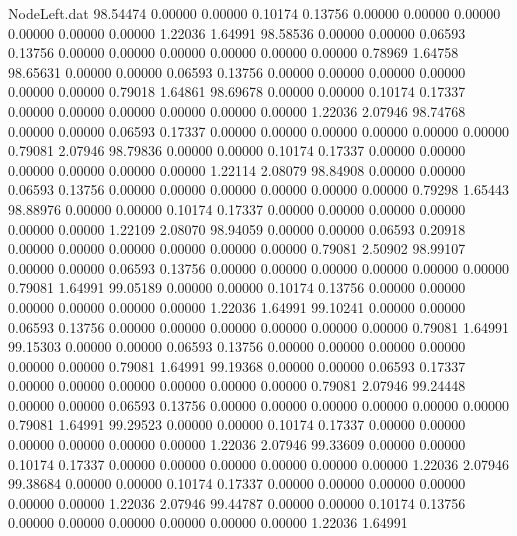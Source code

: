 \begin{filecontents}{NodeLeft.dat}
  98.54474    0.00000    0.00000     0.10174    0.13756    0.00000    0.00000    0.00000    0.00000    0.00000    0.00000    1.22036    1.64991
  98.58536    0.00000    0.00000     0.06593    0.13756    0.00000    0.00000    0.00000    0.00000    0.00000    0.00000    0.78969    1.64758
  98.65631    0.00000    0.00000     0.06593    0.13756    0.00000    0.00000    0.00000    0.00000    0.00000    0.00000    0.79018    1.64861
  98.69678    0.00000    0.00000     0.10174    0.17337    0.00000    0.00000    0.00000    0.00000    0.00000    0.00000    1.22036    2.07946
  98.74768    0.00000    0.00000     0.06593    0.17337    0.00000    0.00000    0.00000    0.00000    0.00000    0.00000    0.79081    2.07946
  98.79836    0.00000    0.00000     0.10174    0.17337    0.00000    0.00000    0.00000    0.00000    0.00000    0.00000    1.22114    2.08079
  98.84908    0.00000    0.00000     0.06593    0.13756    0.00000    0.00000    0.00000    0.00000    0.00000    0.00000    0.79298    1.65443
  98.88976    0.00000    0.00000     0.10174    0.17337    0.00000    0.00000    0.00000    0.00000    0.00000    0.00000    1.22109    2.08070
  98.94059    0.00000    0.00000     0.06593    0.20918    0.00000    0.00000    0.00000    0.00000    0.00000    0.00000    0.79081    2.50902
  98.99107    0.00000    0.00000     0.06593    0.13756    0.00000    0.00000    0.00000    0.00000    0.00000    0.00000    0.79081    1.64991
  99.05189    0.00000    0.00000     0.10174    0.13756    0.00000    0.00000    0.00000    0.00000    0.00000    0.00000    1.22036    1.64991
  99.10241    0.00000    0.00000     0.06593    0.13756    0.00000    0.00000    0.00000    0.00000    0.00000    0.00000    0.79081    1.64991
  99.15303    0.00000    0.00000     0.06593    0.13756    0.00000    0.00000    0.00000    0.00000    0.00000    0.00000    0.79081    1.64991
  99.19368    0.00000    0.00000     0.06593    0.17337    0.00000    0.00000    0.00000    0.00000    0.00000    0.00000    0.79081    2.07946
  99.24448    0.00000    0.00000     0.06593    0.13756    0.00000    0.00000    0.00000    0.00000    0.00000    0.00000    0.79081    1.64991
  99.29523    0.00000    0.00000     0.10174    0.17337    0.00000    0.00000    0.00000    0.00000    0.00000    0.00000    1.22036    2.07946
  99.33609    0.00000    0.00000     0.10174    0.17337    0.00000    0.00000    0.00000    0.00000    0.00000    0.00000    1.22036    2.07946
  99.38684    0.00000    0.00000     0.10174    0.17337    0.00000    0.00000    0.00000    0.00000    0.00000    0.00000    1.22036    2.07946
  99.44787    0.00000    0.00000     0.10174    0.13756    0.00000    0.00000    0.00000    0.00000    0.00000    0.00000    1.22036    1.64991

\end{filecontents}

